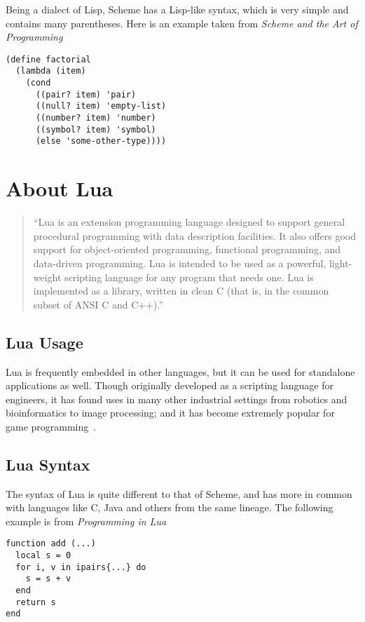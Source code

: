 Being a dialect of Lisp, Scheme has a Lisp-like syntax, which is very simple and
contains many parentheses. Here is an example taken from \emph{Scheme and the
Art of Programming}~\cite[p.40]{schemebook}
\begin{framed}
\begin{verbatim}
(define factorial
  (lambda (item)
    (cond
      ((pair? item) 'pair)
      ((null? item) 'empty-list)
      ((number? item) 'number)
      ((symbol? item) 'symbol)
      (else 'some-other-type))))
\end{verbatim}
\end{framed}


\section{About Lua}

\begin{quotation}
``Lua is an extension programming language designed to support general
procedural programming with data description facilities. It also offers good
support for object-oriented programming, functional programming, and data-driven
programming. Lua is intended to be used as a powerful, light-weight scripting
language for any program that needs one. Lua is implemented as a library,
written in clean C (that is, in the common subset of ANSI C and
C++).''~\cite[Sec~1]{luamanual}
\end{quotation}
\subsection{Lua Usage}

Lua is frequently embedded in other languages, but it can be used for
stand\-alone applications as well. Though originally developed as a scripting
language for engineers, it has found uses in many other industrial settings from
robotics and bioinformatics to image processing; and it has become extremely
popular for game programming~\cite{evolua}.

\subsection{Lua Syntax}

The syntax of Lua is quite different to that of Scheme, and has more in common
with languages like C, Java and others from the same lineage. The following example is from \emph{Programming in Lua}~\cite[p.40]{luabook}
\begin{framed}
\begin{verbatim}
function add (...)
  local s = 0
  for i, v in ipairs{...} do
    s = s + v
  end
  return s
end
\end{verbatim}
\end{framed}

